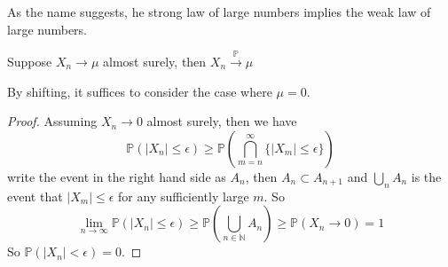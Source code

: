 As the name suggests, he strong law of large numbers implies the weak law of large numbers.
\begin{proposition}
    Suppose $X_n\to\mu$ almost surely, then $X_n\xrightarrow{\mathbb P}\mu$
\end{proposition}
By shifting, it suffices to consider the case where $\mu=0$.
\begin{proof}
    Assuming $X_n\to 0$ almost surely, then we have
    $$\mathbb P(|X_n|\le\epsilon)\ge\mathbb P\left( \bigcap_{m=n}^\infty\{|X_m|\le\epsilon\} \right)$$
    write the event in the right hand side as $A_n$, then $A_n\subset A_{n+1}$ and $\bigcup_nA_n$ is the event that $|X_m|\le\epsilon$ for any sufficiently large $m$.
    So
    $$\lim_{n\to\infty}\mathbb P(|X_n|\le\epsilon)\ge\mathbb P\left( \bigcup_{n\in\mathbb N}A_n \right)\ge\mathbb P(X_n\to 0)=1$$
    So $\mathbb P(|X_n|<\epsilon)=0$.
\end{proof}
